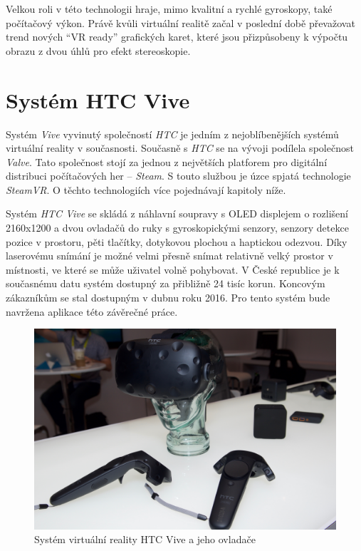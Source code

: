 Velkou roli v této technologii hraje, mimo kvalitní a rychlé gyroskopy,
také počítačový výkon. \autocite{vrtech} Právě kvůli virtuální realitě začal v poslední
době převažovat trend nových ``VR ready'' grafických karet, které jsou
přizpůsobeny k výpočtu obrazu z dvou úhlů pro efekt stereoskopie.

\section{Systém HTC Vive}\label{systuxe9m-htc-vive}

Systém \emph{Vive} vyvinutý společností \emph{HTC} je jedním z
nejoblíbenějších systémů virtuální reality v současnosti. \autocite{vivepopular} Současně s
\emph{HTC} se na vývoji podílela společnost \emph{Valve}. Tato
společnost stojí za jednou z největších platforem pro digitální
distribuci počítačových her -- \emph{Steam}. S touto službou je úzce
spjatá technologie \emph{SteamVR}. O těchto technologiích více
pojednávají kapitoly níže.

Systém \emph{HTC Vive} se skládá z náhlavní soupravy s OLED displejem o
rozlišení 2160x1200 a dvou ovladačů do ruky s gyroskopickými senzory,
senzory detekce pozice v prostoru, pěti tlačítky, dotykovou plochou a
haptickou odezvou. \autocite{vivespec} Díky laserovému snímání je možné velmi přesně snímat
relativně velký prostor v místnosti, ve které se může uživatel volně
pohybovat. V České republice je k současnému datu systém dostupný za
přibližně 24 tisíc korun. \autocite{viveprice} Koncovým zákazníkům se stal dostupným v dubnu
roku 2016. Pro tento systém bude navržena aplikace této závěrečné práce.

\begin{figure}
\centering
\includegraphics[width=12cm]{src/assets/vive-pre.jpeg}
\caption{Systém virtuální reality HTC Vive a jeho ovladače\autocite{htcvivepre}}
\end{figure}

